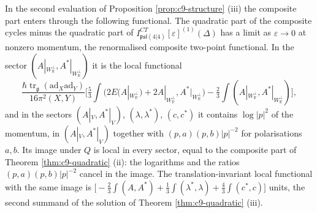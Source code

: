 \begin{remark}
\label{rem:c9-Pi}
In the second evaluation of Proposition \ref{prop:c9-structure} (iii) the composite part enters through the following functional. The quadratic part of the composite cycles minus the quadratic part of $I^{CT}_{\mathfrak{psl}(4|4)}[\varepsilon]^{(1)}(\Delta)$ has a limit as $\varepsilon\to0$ at nonzero momentum, the renormalised composite two-point functional. In the sector $(A|_{W_{\mathbb R}^\perp},A^*|_{W_{\mathbb R}^\perp})$ it is the local functional
\[
\frac{\hbar\operatorname{tr}_{\mathfrak g}(\mathrm{ad}_X\mathrm{ad}_Y)}{16\pi^2(X,Y)}\Big[\tfrac53\int\big(2E(A|_{W_{\mathbb R}^\perp})+2A|_{W_{\mathbb R}^\perp},A^*|_{W_{\mathbb R}^\perp}\big)-\tfrac23\int(A|_{W_{\mathbb R}^\perp},A^*|_{W_{\mathbb R}^\perp})\Big],
\]
and in the sectors $(A|_V,A^*|_V)$, $(\lambda,\lambda^*)$, $(c,c^*)$ it contains $\log|p|^2$ of the momentum, in $(A|_V,A^*|_V)$ together with $(p,a)(p,b)|p|^{-2}$ for polarisations $a,b$. Its image under $Q$ is local in every sector, equal to the composite part of Theorem \ref{thm:c9-quadratic} (ii): the logarithms and the ratios $(p,a)(p,b)|p|^{-2}$ cancel in the image. The translation-invariant local functional with the same image is $\big[-\tfrac23\int(A,A^*)+\tfrac13\int(\lambda^*,\lambda)+\tfrac43\int(c^*,c)\big]$ units, the second summand of the solution of Theorem \ref{thm:c9-quadratic} (iii).
\end{remark}
